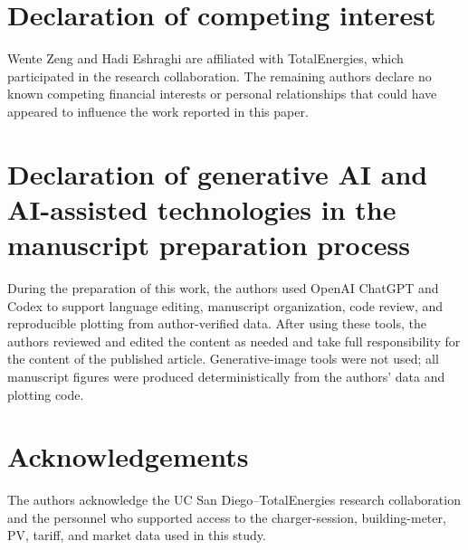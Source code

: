 \documentclass[final,5p,times]{elsarticle}
\begin{document}
\section*{Declaration of competing interest}
Wente Zeng and Hadi Eshraghi are affiliated with TotalEnergies, which
participated in the research collaboration. The remaining authors declare no
known competing financial interests or personal relationships that could have
appeared to influence the work reported in this paper.

\section*{Declaration of generative AI and AI-assisted technologies in the manuscript preparation process}
During the preparation of this work, the authors used OpenAI ChatGPT and Codex
to support language editing, manuscript organization, code review, and
reproducible plotting from author-verified data. After using these tools, the
authors reviewed and edited the content as needed and take full responsibility
for the content of the published article. Generative-image tools were not used;
all manuscript figures were produced deterministically from the authors' data
and plotting code.

\section*{Acknowledgements}
The authors acknowledge the UC San Diego--TotalEnergies research collaboration
and the personnel who supported access to the charger-session, building-meter,
PV, tariff, and market data used in this study.

\clearpage


\end{document}
